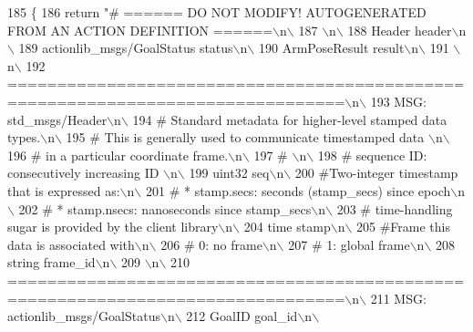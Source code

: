 \begin{DoxyCode}
185   \{
186     \textcolor{keywordflow}{return} \textcolor{stringliteral}{"# ====== DO NOT MODIFY! AUTOGENERATED FROM AN ACTION DEFINITION ======\(\backslash\)n\(\backslash\)}
187 \textcolor{stringliteral}{\(\backslash\)n\(\backslash\)}
188 \textcolor{stringliteral}{Header header\(\backslash\)n\(\backslash\)}
189 \textcolor{stringliteral}{actionlib\_msgs/GoalStatus status\(\backslash\)n\(\backslash\)}
190 \textcolor{stringliteral}{ArmPoseResult result\(\backslash\)n\(\backslash\)}
191 \textcolor{stringliteral}{\(\backslash\)n\(\backslash\)}
192 \textcolor{stringliteral}{================================================================================\(\backslash\)n\(\backslash\)}
193 \textcolor{stringliteral}{MSG: std\_msgs/Header\(\backslash\)n\(\backslash\)}
194 \textcolor{stringliteral}{# Standard metadata for higher-level stamped data types.\(\backslash\)n\(\backslash\)}
195 \textcolor{stringliteral}{# This is generally used to communicate timestamped data \(\backslash\)n\(\backslash\)}
196 \textcolor{stringliteral}{# in a particular coordinate frame.\(\backslash\)n\(\backslash\)}
197 \textcolor{stringliteral}{# \(\backslash\)n\(\backslash\)}
198 \textcolor{stringliteral}{# sequence ID: consecutively increasing ID \(\backslash\)n\(\backslash\)}
199 \textcolor{stringliteral}{uint32 seq\(\backslash\)n\(\backslash\)}
200 \textcolor{stringliteral}{#Two-integer timestamp that is expressed as:\(\backslash\)n\(\backslash\)}
201 \textcolor{stringliteral}{# * stamp.secs: seconds (stamp\_secs) since epoch\(\backslash\)n\(\backslash\)}
202 \textcolor{stringliteral}{# * stamp.nsecs: nanoseconds since stamp\_secs\(\backslash\)n\(\backslash\)}
203 \textcolor{stringliteral}{# time-handling sugar is provided by the client library\(\backslash\)n\(\backslash\)}
204 \textcolor{stringliteral}{time stamp\(\backslash\)n\(\backslash\)}
205 \textcolor{stringliteral}{#Frame this data is associated with\(\backslash\)n\(\backslash\)}
206 \textcolor{stringliteral}{# 0: no frame\(\backslash\)n\(\backslash\)}
207 \textcolor{stringliteral}{# 1: global frame\(\backslash\)n\(\backslash\)}
208 \textcolor{stringliteral}{string frame\_id\(\backslash\)n\(\backslash\)}
209 \textcolor{stringliteral}{\(\backslash\)n\(\backslash\)}
210 \textcolor{stringliteral}{================================================================================\(\backslash\)n\(\backslash\)}
211 \textcolor{stringliteral}{MSG: actionlib\_msgs/GoalStatus\(\backslash\)n\(\backslash\)}
212 \textcolor{stringliteral}{GoalID goal\_id\(\backslash\)n\(\backslash\)}

\end{DoxyCode}
